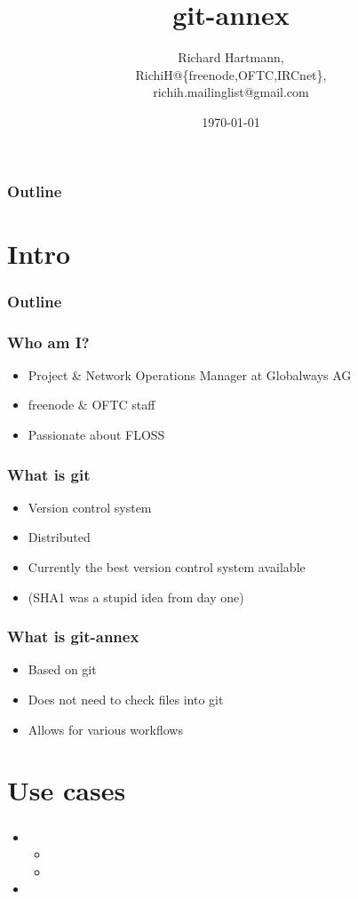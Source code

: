 \documentclass[t]{beamer}
\title{git-annex}
\author{Richard Hartmann,\\
RichiH@\{freenode,OFTC,IRCnet\},\\
richih.mailinglist@gmail.com}
\date{\today}
\begin{document}
\begin{frame}
	\titlepage
\end{frame}

\begin{frame}
	\frametitle{Outline}
	\tableofcontents
\end{frame}


\section{Intro}
\begin{frame}
	\frametitle{Outline}
	\tableofcontents[currentsection]
\end{frame}

\begin{frame}
	\frametitle{Who am I?}
	\begin{itemize}
		\item Project \& Network Operations Manager at Globalways AG
		\item freenode \& OFTC staff
		\item Passionate about FLOSS
	\end{itemize}
\end{frame}

\begin{frame}
	\frametitle{What is git}
	\begin{itemize}
		\item Version control system
		\item Distributed
		\item Currently the best version control system available
		\item (SHA1 was a stupid idea from day one)
	\end{itemize}
\end{frame}

\begin{frame}
	\frametitle{What is git-annex}
	\begin{itemize}
		\item Based on git
		\item Does not need to check files into git
		\item Allows for various workflows
	\end{itemize}
\end{frame}


\section{Use cases}

\begin{frame}
	\frametitle{}
	\begin{itemize}
		\item 
		\begin{itemize}
			\item 
			\item 
		\end{itemize}
		\item 
	\end{itemize}
\end{frame}


\end{document}
